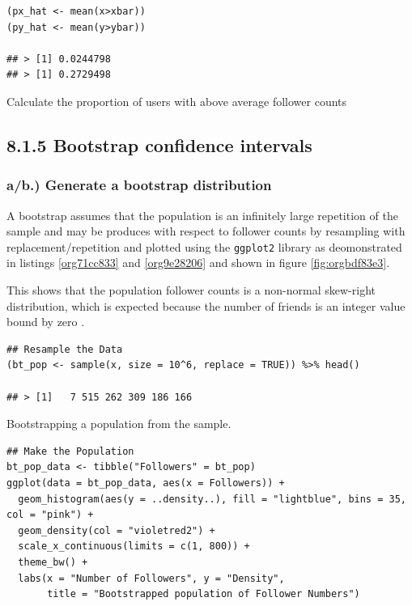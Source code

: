 \documentclass[11pt]{article}
\begin{document}
\begin{listing}[htbp]
\begin{verbatim}
(px_hat <- mean(x>xbar))
(py_hat <- mean(y>ybar))

## > [1] 0.0244798
## > [1] 0.2729498
\end{verbatim}
\caption{\label{orgd8ce8ad}Calculate the proportion of users with above average follower counts}
\end{listing}


\subsection{8.1.5 Bootstrap confidence intervals}
\label{sec:org6ab7cef}
\subsubsection{a/b.) Generate a bootstrap distribution}
\label{sec:orgd257802}

A bootstrap assumes that the population is an infinitely large repetition of the
sample and may be produces with respect to follower counts by resampling with
replacement/repetition and plotted using the \texttt{ggplot2} library as deomonstrated
in listings \ref{org71cc833} and \ref{org9e28206} and shown in figure \ref{fig:orgbdf83e3}.

This shows that the population follower counts is a non-normal skew-right
distribution, which is expected because the number of friends is an integer value bound by zero \cite{nist2013}.

\begin{listing}[htbp]
\begin{verbatim}
## Resample the Data
(bt_pop <- sample(x, size = 10^6, replace = TRUE)) %>% head()

## > [1]   7 515 262 309 186 166
\end{verbatim}
\caption{\label{org71cc833}Bootstrapping a population from the sample.}
\end{listing}

\begin{listing}[htbp]
\begin{verbatim}
## Make the Population
bt_pop_data <- tibble("Followers" = bt_pop)
ggplot(data = bt_pop_data, aes(x = Followers)) +
  geom_histogram(aes(y = ..density..), fill = "lightblue", bins = 35, col = "pink") +
  geom_density(col = "violetred2") +
  scale_x_continuous(limits = c(1, 800)) +
  theme_bw() +
  labs(x = "Number of Followers", y = "Density",
       title = "Bootstrapped population of Follower Numbers")

\end{verbatim}
\label{org9e28206}
\end{listing}
\end{document}
